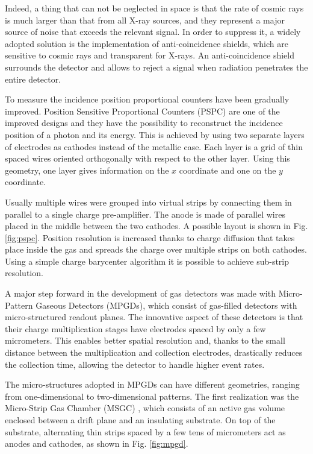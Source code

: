 Indeed, a thing that can not be neglected in space is that the rate of cosmic rays is much larger than that from all X-ray sources, and they represent a major source of noise that exceeds the relevant signal. In order to suppress it, a widely adopted solution is the implementation of anti-coincidence shields, which are sensitive to cosmic rays and transparent for X-rays. An anti-coincidence shield surrounds the detector and allows to reject a signal when radiation penetrates the entire detector.

To measure the incidence position proportional counters have been gradually improved. Position Sensitive Proportional Counters (PSPC) are one of the improved designs and they have the possibility to reconstruct the incidence position of a photon and its energy. This is achieved by using two separate layers of electrodes as cathodes instead of the metallic case. Each layer is a grid of thin spaced wires oriented orthogonally with respect to the other layer. Using this geometry, one layer gives information on the $x$ coordinate and one on the $y$ coordinate.

Usually multiple wires were grouped into virtual strips by connecting them in parallel to a single charge pre-amplifier. The anode is made of parallel wires placed in the middle between the two cathodes. A possible layout is shown in Fig. \ref{fig:pspc}. Position resolution is increased thanks to charge diffusion that takes place inside the gas and spreads the charge over multiple strips on both cathodes. Using a simple charge barycenter algorithm it is possible to achieve sub-strip resolution.

A major step forward in the development of gas detectors was made with Micro-Pattern Gaseous Detectors (MPGDs), which consist of gas-filled detectors with micro-structured readout planes. The innovative aspect of these detectors is that their charge multiplication stages have electrodes spaced by only a few micrometers. This enables better spatial resolution and, thanks to the small distance between the multiplication and collection electrodes, drastically reduces the collection time, allowing the detector to handle higher event rates.

The micro-structures adopted in MPGDs can have different geometries, ranging from one-dimensional to two-dimensional patterns. The first realization was the Micro-Strip Gas Chamber (MSGC) \cite{oed1988}, which consists of an active gas volume enclosed between a drift plane and an insulating substrate. On top of the substrate, alternating thin strips spaced by a few tens of micrometers act as anodes and cathodes, as shown in Fig. \ref{fig:mpgd}.

